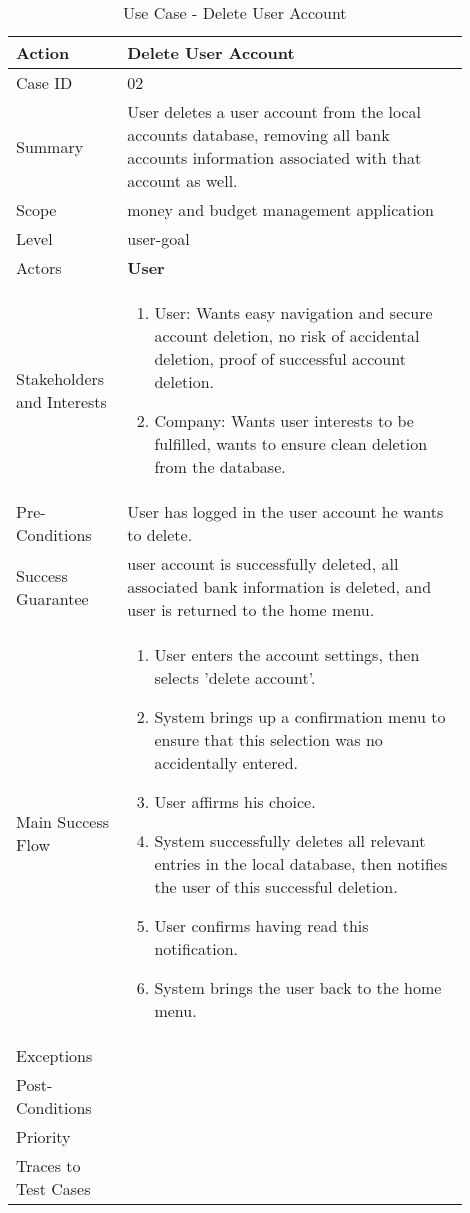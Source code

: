 \documentclass[11pt]{article}
\newcounter{use case ID}
\newcommand\tabularhead[1]{
\begin{table}[ht]
    \addtocounter{use case ID}{1}
    \caption{Use Case \arabic{use case ID} - #1}
    \vspace{0.2cm}
    \begin{tabular}{|p{0.2\linewidth}|p{0.70\linewidth}|}
    \hline
        \textbf{Action} & \textbf{#1} \\
        \hline}
\newcommand\addrow[2]{#1 & #2\\ \hline}
\newcommand\addmulrow[2]{ \begin{minipage}[t][][t]{2.5cm}#1\end{minipage}
        &\begin{minipage}[t][][t]{11cm}
        \begin{enumerate}[itemsep=-1ex] #2   \end{enumerate}
    \end{minipage}\vfill\\ \hline}
\newenvironment{usecase}{\tabularhead}
{\hline\end{tabular}\end{table}}
\begin{document}
\begin{usecase}{Delete User Account}
    \addrow{Case ID}{02}
    \addrow{Summary}{User deletes a user account from the local accounts database, removing all bank accounts information associated with that account as well.}
    \addrow{Scope}{money and budget management application}
    \addrow{Level}{user-goal}
    \addrow{Actors}{\textbf{User}}
    \addmulrow{Stakeholders and Interests}{
        \item User: Wants easy navigation and secure account deletion, no risk of accidental deletion, proof of successful account deletion.
        \item Company: Wants user interests to be fulfilled, wants to ensure clean deletion from the database. }
    \addrow{Pre-Conditions}{User has logged in the user account he wants to delete.}
    \addrow{Success Guarantee}{user account is successfully deleted, all associated bank information is deleted, and user is returned to the home menu.}
    \addmulrow{Main Success Flow}{
        \item User enters the account settings, then selects 'delete account'.
        \item System brings up a confirmation menu to ensure that this selection was no accidentally entered.
        \item User affirms his choice.
        \item System successfully deletes all relevant entries in the local database, then notifies the user of this successful deletion.
        \item User confirms having read this notification.
        \item System brings the user back to the home menu.}
    \addrow{Exceptions}{}
    \addrow{Post-Conditions}{}
    \addrow{Priority}{}
    \addrow{Traces to Test Cases}{}
\end{usecase}
\end{document}
